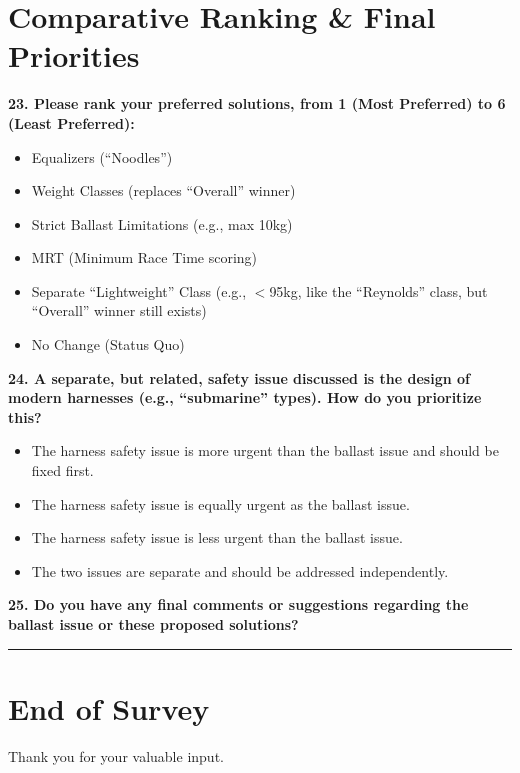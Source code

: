 \documentclass[11pt,a4paper]{article}
\begin{document}
\section{Comparative Ranking \& Final Priorities}

\textbf{23. Please rank your preferred solutions, from 1 (Most Preferred) to 6 (Least Preferred):}
\begin{itemize}[label={}]
    \item \underline{\hspace{0.5cm}} Equalizers (``Noodles'')
    \item \underline{\hspace{0.5cm}} Weight Classes (replaces ``Overall'' winner)
    \item \underline{\hspace{0.5cm}} Strict Ballast Limitations (e.g., max 10kg)
    \item \underline{\hspace{0.5cm}} MRT (Minimum Race Time scoring)
    \item \underline{\hspace{0.5cm}} Separate ``Lightweight'' Class (e.g., $<$95kg, like the ``Reynolds'' class, but ``Overall'' winner still exists)
    \item \underline{\hspace{0.5cm}} No Change (Status Quo)
\end{itemize}

\textbf{24. A separate, but related, safety issue discussed is the design of modern harnesses (e.g., ``submarine'' types). How do you prioritize this?}
\begin{itemize}[label=$\square$]
    \item The harness safety issue is more urgent than the ballast issue and should be fixed first.
    \item The harness safety issue is equally urgent as the ballast issue.
    \item The harness safety issue is less urgent than the ballast issue.
    \item The two issues are separate and should be addressed independently.
\end{itemize}

\textbf{25. Do you have any final comments or suggestions regarding the ballast issue or these proposed solutions?}

\vspace{3cm}
\hrule

\section*{End of Survey}

Thank you for your valuable input.
\end{document}
